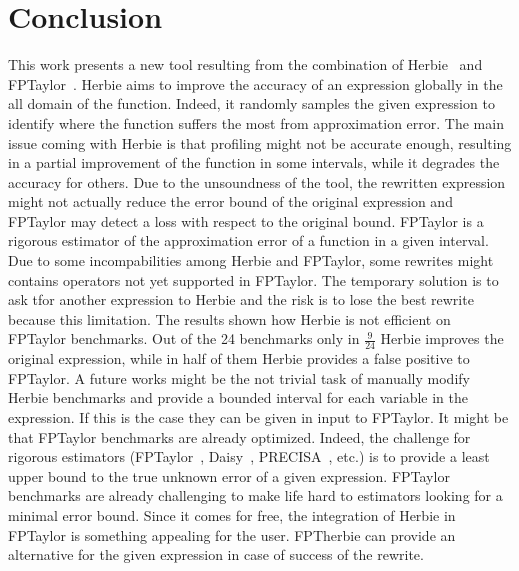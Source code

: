 \documentclass[runningheads]{llncs}
\begin{document}
\section{Conclusion}
This work presents a new tool resulting from the combination of Herbie~\cite{herbie} and FPTaylor~\cite{fptaylor}. 
Herbie aims to improve the accuracy of an expression globally in the all domain of the function. Indeed, it randomly samples the given expression to identify where the function suffers the most from approximation error. The main issue coming with Herbie is that profiling might not be accurate enough, resulting in a partial improvement of the function in some intervals, while it degrades the accuracy for others. Due to the unsoundness of the tool, the rewritten expression might not actually reduce the error bound of the original expression and FPTaylor may detect a loss with respect to the original bound. FPTaylor is a rigorous estimator of the approximation error of a function in a given interval. Due to some incompabilities among Herbie and FPTaylor, some rewrites might contains operators not yet supported in FPTaylor. The temporary solution is to ask tfor another expression to Herbie and the risk is to lose the best rewrite because this limitation.
The results shown how Herbie is not efficient on FPTaylor benchmarks. Out of the 24 benchmarks only in $\frac{9}{24}$ Herbie improves the original expression, while in half of them Herbie provides a false positive to FPTaylor.
A future works might be the not trivial task of manually modify Herbie benchmarks and provide a bounded interval for each variable in the expression. If this is the case they can be given in input to FPTaylor. 
It might be that FPTaylor benchmarks are already optimized. Indeed, the challenge for rigorous estimators (FPTaylor~\cite{fptaylor}, Daisy~\cite{daisy}, PRECISA~\cite{precisa}, etc.) is to provide a least upper bound to the true unknown error of a given expression. FPTaylor benchmarks are already challenging to make life hard to estimators looking for a minimal error bound. Since it comes for free, the integration of Herbie in FPTaylor is something appealing for the user. FPTherbie can provide an alternative for the given expression in case of success of the rewrite. 

%
%


\end{document}

